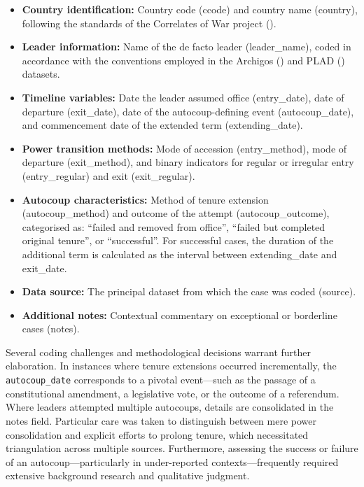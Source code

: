 \documentclass[
  12pt,
]{report}
\begin{document}
\begin{itemize}
\item
  \textbf{Country identification:} Country code (ccode) and country name
  (country), following the standards of the Correlates of War project
  ().
\item
  \textbf{Leader information:} Name of the de facto leader
  (leader\_name), coded in accordance with the conventions employed in
  the Archigos () and PLAD () datasets.
\item
  \textbf{Timeline variables:} Date the leader assumed office
  (entry\_date), date of departure (exit\_date), date of the
  autocoup-defining event (autocoup\_date), and commencement date of the
  extended term (extending\_date).
\item
  \textbf{Power transition methods:} Mode of accession (entry\_method),
  mode of departure (exit\_method), and binary indicators for regular or
  irregular entry (entry\_regular) and exit (exit\_regular).
\item
  \textbf{Autocoup characteristics:} Method of tenure extension
  (autocoup\_method) and outcome of the attempt (autocoup\_outcome),
  categorised as: ``failed and removed from office'', ``failed but
  completed original tenure'', or ``successful''. For successful cases,
  the duration of the additional term is calculated as the interval
  between extending\_date and exit\_date.
\item
  \textbf{Data source:} The principal dataset from which the case was
  coded (source).
\item
  \textbf{Additional notes:} Contextual commentary on exceptional or
  borderline cases (notes).
\end{itemize}

Several coding challenges and methodological decisions warrant further
elaboration. In instances where tenure extensions occurred
incrementally, the \texttt{autocoup\_date} corresponds to a pivotal
event---such as the passage of a constitutional amendment, a legislative
vote, or the outcome of a referendum. Where leaders attempted multiple
autocoups, details are consolidated in the notes field. Particular care
was taken to distinguish between mere power consolidation and explicit
efforts to prolong tenure, which necessitated triangulation across
multiple sources. Furthermore, assessing the success or failure of an
autocoup---particularly in under-reported contexts---frequently required
extensive background research and qualitative judgment.
\end{document}
